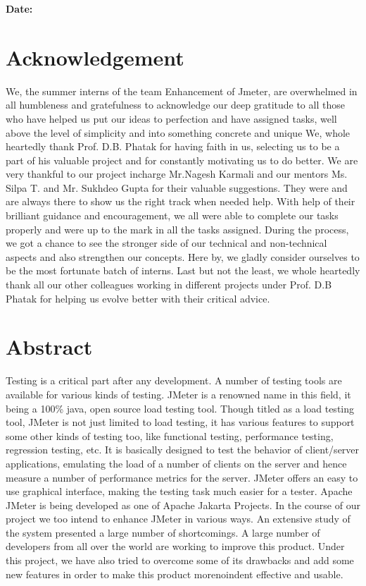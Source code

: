 \documentclass[12pt]{book}
\begin{document}
\vfill
\begin{flushleft}
\textbf{Date:} \underline{\hspace{5cm}} \\
\end{flushleft}


\chapter*{Acknowledgement}
\hfill

\setcounter{page}{1}
We, the summer interns of the team Enhancement of Jmeter, are overwhelmed in all humbleness
and gratefulness to acknowledge our deep gratitude to all those who have helped us put our ideas
to perfection and have assigned tasks, well above the level of simplicity and into something
concrete and unique
We, whole heartedly thank Prof. D.B. Phatak for having faith in us, selecting us to be a part of
his valuable project and for constantly motivating us to do better.
We are very thankful to our project incharge Mr.Nagesh Karmali and our mentors Ms. Silpa T.
and Mr. Sukhdeo Gupta for their valuable suggestions. They were and are always there to show
us the right track when needed help. With help of their brilliant guidance and encouragement, we
all were able to complete our tasks properly and were up to the mark in all the tasks assigned.
During the process, we got a chance to see the stronger side of our technical and non-technical
aspects and also strengthen our concepts. Here by, we gladly consider ourselves to be the most
fortunate batch of interns.
Last but not the least, we whole heartedly thank all our other colleagues working in different
projects under Prof. D.B Phatak for helping us evolve better with their critical advice.

\chapter*{Abstract}
\hfill

Testing is a critical part after any development. A number of testing tools are available for various 
kinds of testing. JMeter is a renowned name in this field, it being a 100\% java, open source load
testing tool. Though titled as a load testing tool, JMeter is not just limited to load testing, it has
various features to support some other kinds of testing too, like functional testing, performance
testing, regression testing, etc. It is basically designed to test the behavior of client/server
applications, emulating the load of a number of clients on the server and hence measure a number of
performance metrics for the server. JMeter offers an easy to use graphical interface, making the
testing task much easier for a tester. Apache JMeter is being developed as one of Apache Jakarta
Projects. In the course of our project we too intend to enhance JMeter in various ways. An extensive
study of the system presented a large number of shortcomings. A large number of developers from
all over the world are working to improve this product. Under this project, we have also tried to
overcome some of its drawbacks and add some new features in order to make this product morenoindent
effective and usable.
\end{document}
